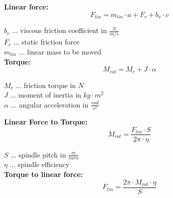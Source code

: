 	\begin{minipage}[t]{0.499\textwidth}
		\begin{tcolorbox}[title=Force/Torque]
			\textbf{Linear force:}
			\[F_{lin}=m_{lin}\cdot a + F_{r} + b_{v}\cdot v \]
			
			$ b_{v} $ ... viscous friction coefficient in $ \frac{N}{m/s} $\\
			$ F_{r} $ ... static friction force\\
			$ m_{lin} $ ... linear mass to be moved\\
			
			\textbf{Torque:}
			\[M_{rot} = M_{r} + J\cdot \alpha \]
			
			$ M_{r} $ ... friction torque in $ N $\\
			$ J $ ... moment of inertia in $ kg\cdot m^{2} $\\
			$ \alpha $ ... angular acceleration in $ \frac{rad}{s^{2}} $\\
		\end{tcolorbox}
	\end{minipage}
	\begin{minipage}[t]{0.499\textwidth}
		\begin{tcolorbox}[title=Force/Torque Transmissions]
			\textbf{Linear Force to Torque:}
			\[M_{rot} = \frac{F_{lin}\cdot S}{2\pi\cdot \eta} \]
			
			$ S $ ... spindle pitch in $ \frac{m}{turn} $\\
			$ \eta $ ... spindle efficiency\\ 
			
			\textbf{Torque to linear force:}
			\[F_{lin} = \frac{2\pi \cdot M_{rot}\cdot \eta}{S} \]
			\vspace{0.75cm}
		\end{tcolorbox}
	\end{minipage}
	
